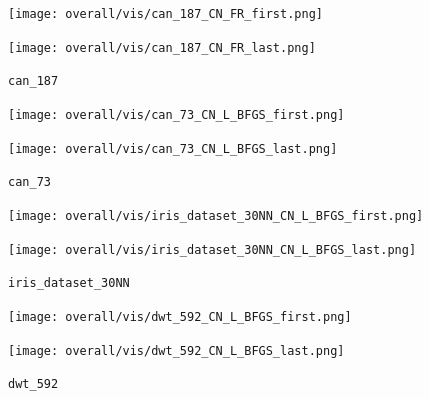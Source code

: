 \documentclass[dvipdfmx,10pt,journal,compsoc]{IEEEtran}
\begin{document}
\begin{figure}[t]
    \centering
    \begin{minipage}{0.49\columnwidth}
        \centering
        \texttt{[image: overall/vis/can\_187\_CN\_FR\_first.png]}
    \end{minipage}
    \begin{minipage}{0.49\columnwidth}
        \centering
        \texttt{[image: overall/vis/can\_187\_CN\_FR\_last.png]}
    \end{minipage}
    \caption{\texttt{can\_187}}
    \label{fig:can_187}
\end{figure}
\begin{figure}[t]
    \centering
    \begin{minipage}{0.49\columnwidth}
        \centering
        \texttt{[image: overall/vis/can\_73\_CN\_L\_BFGS\_first.png]}
    \end{minipage}
    \begin{minipage}{0.49\columnwidth}
        \centering
        \texttt{[image: overall/vis/can\_73\_CN\_L\_BFGS\_last.png]}
    \end{minipage}
    \caption{\texttt{can\_73}}
    \label{fig:can_73}
\end{figure}
\begin{figure}[t]
    \centering
    \begin{minipage}{0.49\columnwidth}
        \centering
        \texttt{[image: overall/vis/iris\_dataset\_30NN\_CN\_L\_BFGS\_first.png]}
    \end{minipage}
    \begin{minipage}{0.49\columnwidth}
        \centering
        \texttt{[image: overall/vis/iris\_dataset\_30NN\_CN\_L\_BFGS\_last.png]}
    \end{minipage}
    \caption{\texttt{iris\_dataset\_30NN}}
    \label{fig:iris_dataset_30NN}
\end{figure}
\begin{figure}[t]
    \centering
    \begin{minipage}{0.49\columnwidth}
        \centering
        \texttt{[image: overall/vis/dwt\_592\_CN\_L\_BFGS\_first.png]}
    \end{minipage}
    \begin{minipage}{0.49\columnwidth}
        \centering
        \texttt{[image: overall/vis/dwt\_592\_CN\_L\_BFGS\_last.png]}
    \end{minipage}
    \caption{\texttt{dwt\_592}}
    \label{fig:dwt_592}
\end{figure}
\end{document}

